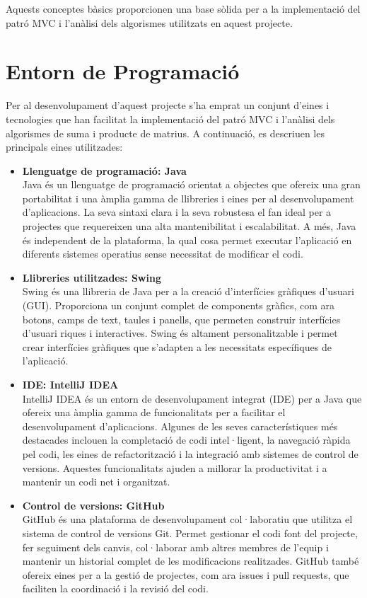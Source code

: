 \documentclass{ieeetj}
\begin{document}
Aquests conceptes bàsics proporcionen una base sòlida per a la implementació del patró MVC i l'anàlisi dels algorismes utilitzats en aquest projecte.

\section{Entorn de Programació}
Per al desenvolupament d'aquest projecte s'ha emprat un conjunt d'eines i tecnologies que han facilitat la implementació del patró MVC i l'anàlisi dels algorismes de suma i producte de matrius. A continuació, es descriuen les principals eines utilitzades:

\begin{itemize}
    \item \textbf{Llenguatge de programació: Java} \\
    Java és un llenguatge de programació orientat a objectes que ofereix una gran portabilitat i una àmplia gamma de llibreries i eines per al desenvolupament d'aplicacions. La seva sintaxi clara i la seva robustesa el fan ideal per a projectes que requereixen una alta mantenibilitat i escalabilitat. A més, Java és independent de la plataforma, la qual cosa permet executar l'aplicació en diferents sistemes operatius sense necessitat de modificar el codi.

    \item \textbf{Llibreries utilitzades: Swing} \\
    Swing és una llibreria de Java per a la creació d'interfícies gràfiques d'usuari (GUI). Proporciona un conjunt complet de components gràfics, com ara botons, camps de text, taules i panells, que permeten construir interfícies d'usuari riques i interactives. Swing és altament personalitzable i permet crear interfícies gràfiques que s'adapten a les necessitats específiques de l'aplicació.

    \item \textbf{IDE: IntelliJ IDEA} \\
    IntelliJ IDEA és un entorn de desenvolupament integrat (IDE) per a Java que ofereix una àmplia gamma de funcionalitats per a facilitar el desenvolupament d'aplicacions. Algunes de les seves característiques més destacades inclouen la completació de codi intel·ligent, la navegació ràpida pel codi, les eines de refactorització i la integració amb sistemes de control de versions. Aquestes funcionalitats ajuden a millorar la productivitat i a mantenir un codi net i organitzat.

    \item \textbf{Control de versions: GitHub} \\
    GitHub és una plataforma de desenvolupament col·laboratiu que utilitza el sistema de control de versions Git. Permet gestionar el codi font del projecte, fer seguiment dels canvis, col·laborar amb altres membres de l'equip i mantenir un historial complet de les modificacions realitzades. GitHub també ofereix eines per a la gestió de projectes, com ara issues i pull requests, que faciliten la coordinació i la revisió del codi.
\end{itemize}
\end{document}

